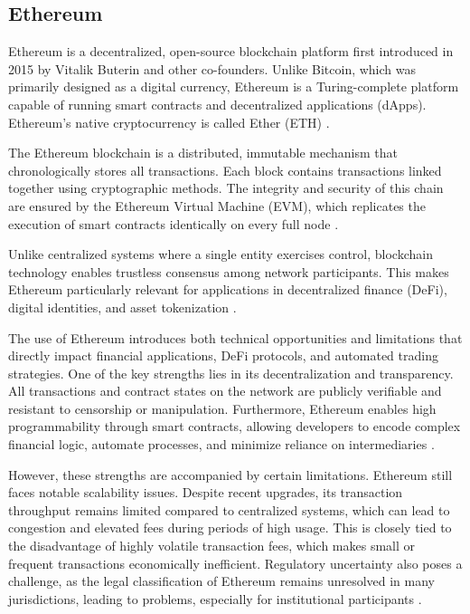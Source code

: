 \subsection{Ethereum}

Ethereum is a decentralized, open-source blockchain platform first introduced in 2015 by Vitalik Buterin and other co-founders.
Unlike Bitcoin, which was primarily designed as a digital currency, Ethereum is a Turing-complete platform capable of running smart contracts and decentralized applications (dApps).
Ethereum's native cryptocurrency is called Ether (ETH) \cite{eth-1}.

The Ethereum blockchain is a distributed, immutable mechanism that chronologically stores all transactions.
Each block contains transactions linked together using cryptographic methods.
The integrity and security of this chain are ensured by the Ethereum Virtual Machine (EVM), which replicates the execution of smart contracts identically on every full node \cite{eth-1}.

Unlike centralized systems where a single entity exercises control, blockchain technology enables trustless consensus among network participants.
This makes Ethereum particularly relevant for applications in decentralized finance (DeFi), digital identities, and asset tokenization \cite{eth-1}.

The use of Ethereum introduces both technical opportunities and limitations that directly impact financial applications, DeFi protocols, and automated trading strategies.
One of the key strengths lies in its decentralization and transparency.
All transactions and contract states on the network are publicly verifiable and resistant to censorship or manipulation.
Furthermore, Ethereum enables high programmability through smart contracts, allowing developers to encode complex financial logic, automate processes, and minimize reliance on intermediaries \cite{eth-3}.

However, these strengths are accompanied by certain limitations.
Ethereum still faces notable scalability issues.
Despite recent upgrades, its transaction throughput remains limited compared to centralized systems, which can lead to congestion and elevated fees during periods of high usage.
This is closely tied to the disadvantage of highly volatile transaction fees, which makes small or frequent transactions economically inefficient.
Regulatory uncertainty also poses a challenge, as the legal classification of Ethereum remains unresolved in many jurisdictions, leading to problems, especially for institutional participants \cite{eth-3}.

